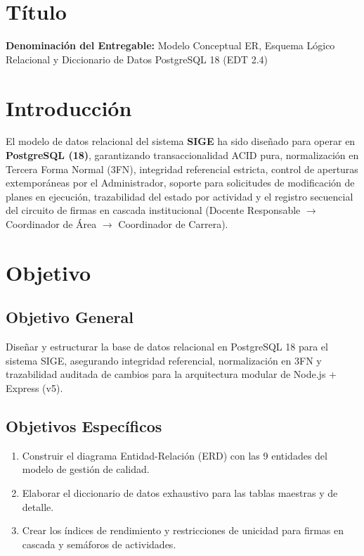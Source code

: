 \documentclass[12pt,a4paper]{article}
\begin{document}

\vspace{0.25cm}
\section{Título}
\textbf{Denominación del Entregable:} Modelo Conceptual ER, Esquema Lógico Relacional y Diccionario de Datos PostgreSQL 18 (EDT 2.4)



\section{Introducción}
El modelo de datos relacional del sistema \textbf{SIGE} ha sido diseñado para operar en \textbf{PostgreSQL (18)}, garantizando transaccionalidad ACID pura, normalización en Tercera Forma Normal (3FN), integridad referencial estricta, control de aperturas extemporáneas por el Administrador, soporte para solicitudes de modificación de planes en ejecución, trazabilidad del estado por actividad y el registro secuencial del circuito de firmas en cascada institucional (Docente Responsable $\rightarrow$ Coordinador de Área $\rightarrow$ Coordinador de Carrera).

\section{Objetivo}

\subsection{Objetivo General}
Diseñar y estructurar la base de datos relacional en PostgreSQL 18 para el sistema SIGE, asegurando integridad referencial, normalización en 3FN y trazabilidad auditada de cambios para la arquitectura modular de Node.js + Express (v5).

\subsection{Objetivos Específicos}
\begin{enumerate}[leftmargin=1.5em, itemsep=2pt, topsep=2pt]
    \item Construir el diagrama Entidad-Relación (ERD) con las 9 entidades del modelo de gestión de calidad.
    \item Elaborar el diccionario de datos exhaustivo para las tablas maestras y de detalle.
    \item Crear los índices de rendimiento y restricciones de unicidad para firmas en cascada y semáforos de actividades.
\end{enumerate}
\end{document}
